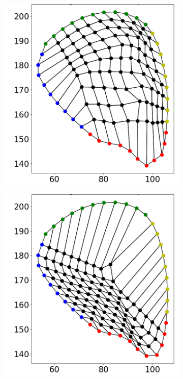 \begin{figure}
\begin{subfigure}[t]{0.24\textwidth}
    \label{fig:tri_01}%
  \end{subfigure}
  \begin{subfigure}[t]{0.24\textwidth}%
    \centering%
    \includegraphics[width=\textwidth, trim=30mm 14mm 6mm 6mm, clip]{images/fiber_creation/mesh_plots/out_1_1_0_w.png}%
    \label{fig:tri_11}%
  \end{subfigure}
  \begin{subfigure}[t]{0.24\textwidth}%
    \centering%
    \includegraphics[width=\textwidth, trim=30mm 14mm 6mm 6mm, clip]{images/fiber_creation/mesh_plots/out_2_1_0_w.png}%
    \label{fig:tri_21}%
  \end{subfigure}\\[-4mm]
  

\end{figure}
